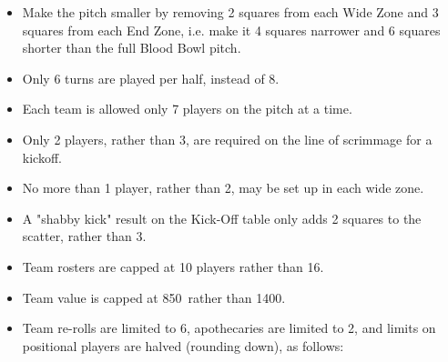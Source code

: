 \documentclass{article}
\newcommand\TV{1400}
\newcommand\TVsevens{850}
\begin{document}
\begin{itemize}
\item Make the pitch smaller by removing 2 squares from each Wide Zone and 3 squares from each End Zone, i.e. make it 4 squares narrower and 6 squares shorter than the full Blood Bowl pitch.
\item Only 6 turns are played per half, instead of 8.
\item Each team is allowed only 7 players on the pitch at a time.
\item Only 2 players, rather than 3, are required on the line of scrimmage for a kickoff.
\item No more than 1 player, rather than 2, may be set up in each wide zone.
\item A "shabby kick" result on the Kick-Off table only adds 2 squares to the scatter, rather than 3.
\item Team rosters are capped at 10 players rather than 16.
\item Team value is capped at \TVsevens\ rather than \TV .
\item Team re-rolls are limited to 6, apothecaries are limited to 2, and limits on positional players are halved (rounding down), as follows:
\end{itemize}
\end{document}
